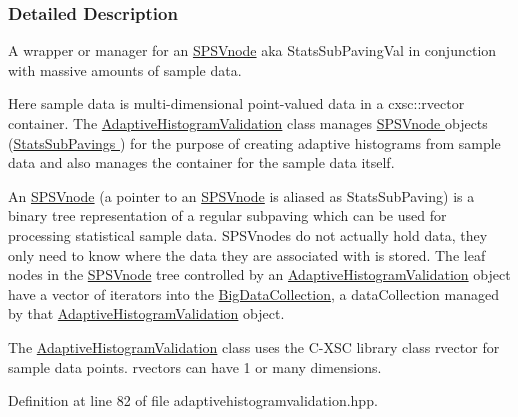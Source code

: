 \subsubsection{\-Detailed \-Description}
\-A wrapper or manager for an \hyperlink{classsubpavings_1_1SPSVnode}{\-S\-P\-S\-Vnode} aka \-Stats\-Sub\-Paving\-Val in conjunction with massive amounts of sample data. 

\-Here sample data is multi-\/dimensional point-\/valued data in a cxsc\-::rvector container. \-The \hyperlink{classsubpavings_1_1AdaptiveHistogramValidation}{\-Adaptive\-Histogram\-Validation} class manages \hyperlink{classsubpavings_1_1SPSVnode}{\-S\-P\-S\-Vnode } objects (\hyperlink{namespacesubpavings_ace6b16f0adf0db13eeb38e124d5328c6}{\-Stats\-Sub\-Pavings }) for the purpose of creating adaptive histograms from sample data and also manages the container for the sample data itself.

\-An \hyperlink{classsubpavings_1_1SPSVnode}{\-S\-P\-S\-Vnode} (a pointer to an \hyperlink{classsubpavings_1_1SPSVnode}{\-S\-P\-S\-Vnode} is aliased as \-Stats\-Sub\-Paving) is a binary tree representation of a regular subpaving which can be used for processing statistical sample data. \-S\-P\-S\-Vnodes do not actually hold data, they only need to know where the data they are associated with is stored. \-The leaf nodes in the \hyperlink{classsubpavings_1_1SPSVnode}{\-S\-P\-S\-Vnode} tree controlled by an \hyperlink{classsubpavings_1_1AdaptiveHistogramValidation}{\-Adaptive\-Histogram\-Validation} object have a vector of iterators into the \hyperlink{namespacesubpavings_aa79f33663da92502ce1a37f3fd1f3d85}{\-Big\-Data\-Collection}, a data\-Collection managed by that \hyperlink{classsubpavings_1_1AdaptiveHistogramValidation}{\-Adaptive\-Histogram\-Validation} object.

\-The \hyperlink{classsubpavings_1_1AdaptiveHistogramValidation}{\-Adaptive\-Histogram\-Validation} class uses the \-C-\/\-X\-S\-C library class rvector for sample data points. rvectors can have 1 or many dimensions. 

\-Definition at line 82 of file adaptivehistogramvalidation.\-hpp.



